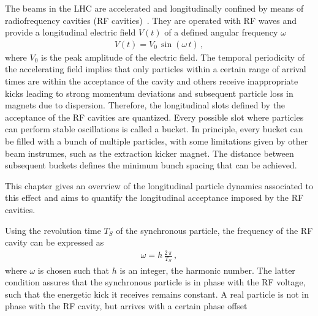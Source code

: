 

The beams in the LHC are accelerated and longitudinally confined by means of radiofrequency cavities (RF cavities)~\cite{wiedemann1999particle}. They are operated with RF waves and provide a longitudinal electric field $V(t)$ of a defined angular frequency $\omega$ 
%
\begin{align}
  V(t) = V_0 \, \sin (\omega \, t) \, ,
\end{align}
%
where $V_0$ is the peak amplitude of the electric field. The temporal periodicity of the accelerating field implies that only particles within a certain range of arrival times are within the acceptance of the cavity and others receive inappropriate kicks leading to strong momentum deviations and subsequent particle loss in magnets due to dispersion. Therefore, the longitudinal slots defined by the acceptance of the RF cavities are quantized. Every possible slot where particles can perform stable oscillations is called a bucket. In principle, every bucket can be filled with a bunch of multiple particles, with some limitations given by other beam instrumes, such as the extraction kicker magnet. The distance between subsequent buckets defines the minimum bunch spacing that can be achieved. 

This chapter gives an overview of the longitudinal particle dynamics associated to this effect and aims to quantify the longitudinal acceptance imposed by the RF cavities. 





Using the revolution time $T_S$ of the synchronous particle, the frequency of the RF cavity can be expressed as
\begin{align}
  \omega = h \, \frac{2 \, \pi}{T_S} \, ,
\end{align}
where $\omega$ is chosen such that $h$ is an integer, the harmonic number. The latter condition assures that the synchronous particle is in phase with the RF voltage, such that the energetic kick it receives remains constant. A real particle is not in phase with the RF cavity, but arrives with a certain phase offset
%






